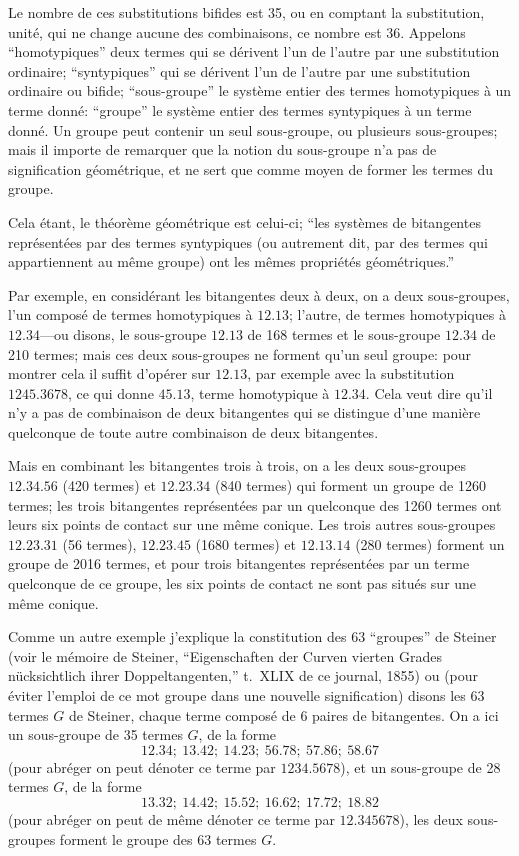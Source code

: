 \documentclass[11pt,a4paper]{article}
\begin{document}
Le nombre de ces substitutions bifides est 35, ou en comptant la substitution, unit\'{e}, qui ne change aucune des combinaisons, ce nombre est 36. Appelons ``homotypiques'' deux termes qui se d\'{e}rivent l'un de l'autre par une substitution ordinaire; ``syntypiques'' qui se d\'{e}rivent l'un de l'autre par une substitution ordinaire ou bifide; ``sous-groupe'' le syst\`{e}me entier des termes homotypiques \`{a} un terme donn\'{e}: ``groupe'' le syst\`{e}me entier des termes syntypiques \`{a} un terme donn\'{e}. Un groupe peut contenir un seul sous-groupe, ou plusieurs sous-groupes; mais il importe de remarquer que la notion du sous-groupe n'a pas de signification g\'{e}om\'{e}trique, et ne sert que comme moyen de former les termes du groupe.

Cela \'{e}tant, le th\'{e}or\`{e}me g\'{e}om\'{e}trique est celui-ci; ``les syst\`{e}mes de bitangentes repr\'{e}sent\'{e}es par des termes syntypiques (ou autrement dit, par des termes qui appartiennent au m\^{e}me groupe) ont les m\^{e}mes propri\'{e}t\'{e}s g\'{e}om\'{e}triques.''

Par exemple, en consid\'{e}rant les bitangentes deux \`{a} deux, on a deux sous-groupes, l'un compos\'{e} de termes homotypiques \`{a} $12.13$; l'autre, de termes homotypiques \`{a} $12.34$---ou disons, le sous-groupe $12.13$ de 168 termes et le sous-groupe $12.34$ de 210 termes; mais ces deux sous-groupes ne forment qu'un seul groupe: pour montrer cela il suffit d'op\'{e}rer sur $12.13$, par exemple avec la substitution $1245.3678$, ce qui donne $45.13$, terme homotypique \`{a} $12.34$. Cela veut dire qu'il n'y a pas de combinaison de deux bitangentes qui se distingue d'une mani\`{e}re quelconque de toute autre combinaison de deux bitangentes.

Mais en combinant les bitangentes trois \`{a} trois, on a les deux sous-groupes $12.34.56$ (420 termes) et $12.23.34$ (840 termes) qui forment un groupe de 1260 termes; les trois bitangentes repr\'{e}sent\'{e}es par un quelconque des 1260 termes ont leurs six points de contact sur une m\^{e}me conique. Les trois autres sous-groupes $12.23.31$ (56 termes), $12.23.45$ (1680 termes) et $12.13.14$ (280 termes) forment un groupe de 2016 termes, et pour trois bitangentes repr\'{e}sent\'{e}es par un terme quelconque de ce groupe, les six points de contact ne sont pas situ\'{e}s sur une m\^{e}me conique.

Comme un autre exemple j'explique la constitution des 63 ``groupes'' de Steiner (voir le m\'{e}moire de Steiner, ``Eigenschaften der Curven vierten Grades n\"{u}cksichtlich ihrer Doppeltangenten,'' t.\ XLIX de ce journal, 1855) ou (pour \'{e}viter l'emploi de ce mot groupe dans une nouvelle signification) disons les 63 termes $G$ de Steiner, chaque terme compos\'{e} de 6 paires de bitangentes. On a ici un sous-groupe de 35 termes $G$, de la forme
\[
12.34;\ 13.42;\ 14.23;\ 56.78;\ 57.86;\ 58.67
\]
(pour abr\'{e}ger on peut d\'{e}noter ce terme par $1234.5678$), et un sous-groupe de 28 termes $G$, de la forme
\[
13.32;\ 14.42;\ 15.52;\ 16.62;\ 17.72;\ 18.82
\]
(pour abr\'{e}ger on peut de m\^{e}me d\'{e}noter ce terme par $12.345678$), les deux sous-groupes forment le groupe des 63 termes $G$.
\end{document}
